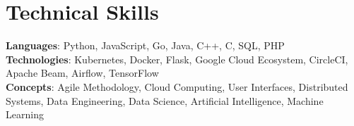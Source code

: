 \vspace{-8pt}
\section{Technical Skills}
    \begin{itemize}[leftmargin=0.15in, label={}]
	\small{\item{
		\textbf{Languages}{: Python, JavaScript, Go, Java, C++, C, SQL, PHP} \\
		\textbf{Technologies}{: Kubernetes, Docker, Flask, Google Cloud Ecosystem, CircleCI, Apache Beam, Airflow, TensorFlow} \\
		\textbf{Concepts}{: Agile Methodology, Cloud Computing, User Interfaces, Distributed Systems, Data Engineering, Data Science, Artificial Intelligence, Machine Learning }
	}}
    \end{itemize}
